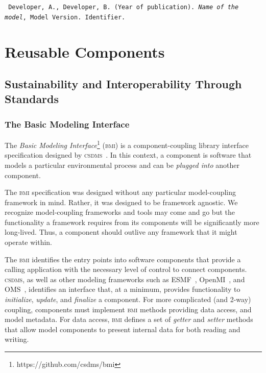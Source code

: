 \documentclass[11pt, oneside]{amsart}
\DeclareRobustCommand{\csdms}{\textsc{csdms}}
\DeclareRobustCommand{\bmi}{\textsc{bmi}}
\begin{document}
\begin{shaded}
\leftskip 0.25in
\parindent -0.25in
\tt{
Developer, A., Developer, B. (Year of publication). \emph{Name of the model},
Model Version. Identifier.
}
\end{shaded}

\section{Reusable Components}
\label{sec:reusable}

\subsection{Sustainability and Interoperability Through Standards}
\label{sec:standards}

\subsubsection{The Basic Modeling Interface}
\label{sec:bmi}

The \emph{Basic Modeling Interface}\footnote{https://github.com/csdms/bmi}
(\bmi{}) is a component-coupling library
interface specification designed by \csdms~\cite{peckham2012component,
syvitski2014plug}.  In this context, a component is software that models a
particular environmental process and can be \emph{plugged into} another
component.

The \bmi{} specification was designed without any particular model-coupling
framework in mind.  Rather, it was designed to be framework agnostic. We
recognize model-coupling frameworks and tools may come and go but the
functionality a framework requires from its components will be significantly
more long-lived. Thus, a component should outlive any framework that it might
operate within.

The \bmi{} identifies the entry points into software components that provide a
calling application with the necessary level of control to connect components.
\csdms{}, as well as other modeling frameworks such as
ESMF~\cite{hill2004architecture}, OpenMI~\cite{gregersen2007openmi}, and
OMS~\cite{david2002object}, identifies an interface that, at a minimum,
provides functionality to \emph{initialize}, \emph{update}, and
\emph{finalize} a component. For more complicated (and 2-way)
coupling, components must implement \bmi{} methods providing data access,
and model metadata. For data access, \bmi{} defines a set of \emph{getter}
and \emph{setter} methods that allow model components to present internal data
for both reading and writing.
\end{document}
